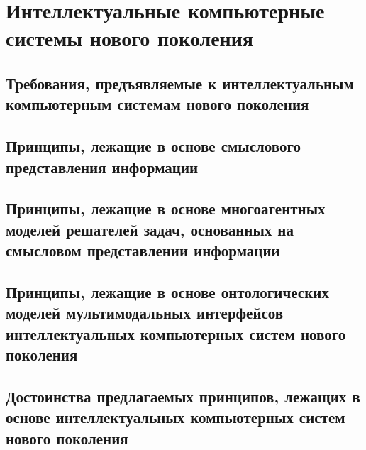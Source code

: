 \chapter{Интеллектуальные компьютерные системы нового поколения}
\label{chapter_new_generation_systems} 


\section{Требования, предъявляемые к интеллектуальным компьютерным системам нового поколения}
\section{Принципы, лежащие в основе смыслового представления информации}
\section{Принципы, лежащие в основе многоагентных моделей решателей задач, основанных на смысловом представлении информации}
\section{Принципы, лежащие в основе онтологических моделей мультимодальных интерфейсов интеллектуальных компьютерных систем нового поколения}
\section{Достоинства предлагаемых принципов, лежащих в основе интеллектуальных компьютерных систем нового поколения}

%
